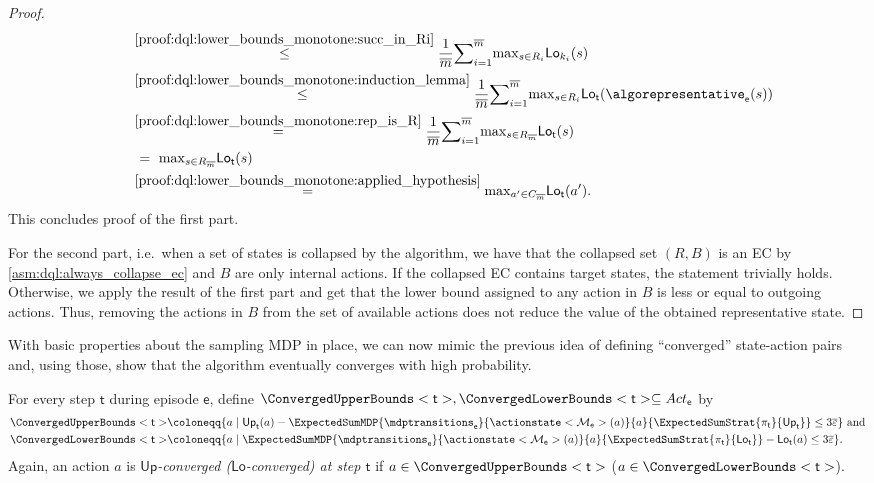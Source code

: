 \documentclass{theoretics}
\newcommand{\MDP}{\mathcal{M}}
\newcommand{\Actions}{Act}
\newcommand{\strategy}{\pi}
\newcommand{\upperbound}{\mathsf{Up}}
\newcommand{\lowerbound}{\mathsf{Lo}}
\newcommand{\updatestep}{{\overline{\varepsilon}}}
\newcommand{\delay}{{\overline{m}}}
\newcommand{\algostep}{\mathsf{t}}
\newcommand{\algoepisode}{\mathsf{e}}
\begin{document}
\begin{proof}
\begin{align*}
		& \qquad \overset{\ref{proof:dql:lower_bounds_monotone:succ_in_Ri}}{~\leq~} \frac{1}{\delay} {\sum}_{i = 1}^\delay {\max}_{s \in R_i} \lowerbound_{k_i}(s) \\
		& \qquad \overset{\ref{proof:dql:lower_bounds_monotone:induction_lemma}}{~\leq~} \frac{1}{\delay} {\sum}_{i = 1}^\delay {\max}_{s \in R_i} \lowerbound_\algostep(\algorepresentative_\algoepisode(s)) \\
		& \qquad \overset{\ref{proof:dql:lower_bounds_monotone:rep_is_R}}{~=~} \frac{1}{\delay} {\sum}_{i = 1}^\delay {\max}_{s \in R_{\delay}} \lowerbound_\algostep(s) \\
		& \qquad ~=~ {\max}_{s \in R_{\delay}} \lowerbound_\algostep(s) \\
		& \qquad \overset{\ref{proof:dql:lower_bounds_monotone:applied_hypothesis}}{~=~} {\max}_{a' \in C_{\delay}} \lowerbound_\algostep(a').
	\end{align*}
	This concludes proof of the first part.

	For the second part, i.e.\ when a set of states is collapsed by the algorithm, we have that the collapsed set $(R, B)$ is an EC by \cref{asm:dql:always_collapse_ec} and $B$ are only internal actions.
	If the collapsed EC contains target states, the statement trivially holds.
	Otherwise, we apply the result of the first part and get that the lower bound assigned to any action in $B$ is less or equal to outgoing actions.
	Thus, removing the actions in $B$ from the set of available actions does not reduce the value of the obtained representative state. 
\end{proof}
With basic properties about the sampling MDP in place, we can now mimic the previous idea of defining \enquote{converged} state-action pairs and, using those, show that the algorithm eventually converges with high probability.
\begin{definition} \label{def:dql:converged_bounds}
	For every step $\algostep$ during episode $\algoepisode$, define $\ConvergedUpperBounds<\algostep>, \ConvergedLowerBounds<\algostep> \subseteq \Actions_{\algoepisode}$ by
	\begin{align*}
		\ConvergedUpperBounds<\algostep> & \coloneqq \{a \mid \upperbound_\algostep(a) - \ExpectedSumMDP{\mdptransitions_\algoepisode}{\actionstate<\MDP_\algoepisode>(a)}{a}{\ExpectedSumStrat{\strategy_\algostep}{\upperbound_\algostep}} \leq 3 \updatestep\} \text{ and}\\
		\ConvergedLowerBounds<\algostep> & \coloneqq \{a \mid \ExpectedSumMDP{\mdptransitions_\algoepisode}{\actionstate<\MDP_\algoepisode>(a)}{a}{\ExpectedSumStrat{\strategy_\algostep}{\lowerbound_\algostep}} - \lowerbound_\algostep(a) \leq 3 \updatestep\}.
	\end{align*}
	Again, an action $a$ is \emph{$\upperbound$-converged ($\lowerbound$-converged) at step $\algostep$} if $a \in \ConvergedUpperBounds<\algostep>$ ($a \in \ConvergedLowerBounds<\algostep>$).
\end{definition}
\end{document}
